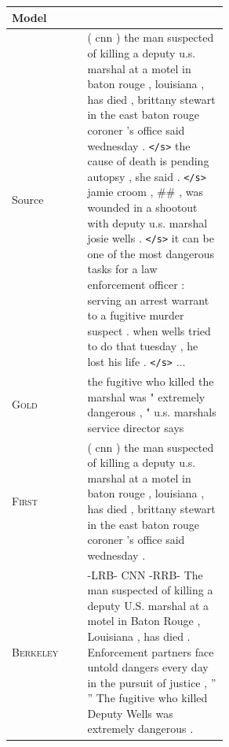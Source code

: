 \documentclass[12pt]{report}
\begin{document}
\begin{figure}[p]
\centering
\begin{tabular}{ll p{0.65\linewidth}}
\toprule
Model & & \\
\midrule
Source & & ( cnn ) the man suspected of killing a deputy u.s. marshal at a motel in baton rouge , louisiana , has died , brittany stewart in the east baton rouge coroner 's office said wednesday . \texttt{</s>} the cause of death is pending autopsy , she said . \texttt{</s>} jamie croom , \#\# , was wounded in a shootout with deputy u.s. marshal josie wells . \texttt{</s>} it can be one of the most dangerous tasks for a law enforcement officer : serving an arrest warrant to a fugitive murder suspect . when wells tried to do that tuesday , he lost his life . \texttt{</s>}  ... \\
\midrule
\textsc{Gold} & & the fugitive who killed the marshal was " extremely dangerous , " u.s. marshals service director says \\
\midrule
\textsc{First} & & ( cnn ) the man suspected of killing a deputy u.s. marshal at a motel in baton rouge , louisiana , has died , brittany stewart in the east baton rouge coroner 's office said wednesday .\\
 \midrule
\textsc{Berkeley} & & -LRB- CNN -RRB- The man suspected of killing a deputy U.S. marshal at a motel in Baton Rouge , Louisiana , has died . Enforcement partners face untold dangers every day in the pursuit of justice , '' '' The fugitive who killed Deputy Wells was extremely dangerous . \\
\midrule


\end{tabular}
\end{figure}
\end{document}
